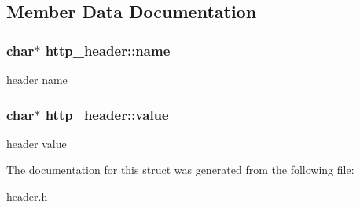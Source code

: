 \subsection{Member Data Documentation}
\hypertarget{structhttp__header_a4b8f00a2ee309ded1317bf3a24450d4b}{
\subsubsection[{name}]{\setlength{\rightskip}{0pt plus 5cm}char$\ast$ {\bf http\_\-header::name}}}
\label{structhttp__header_a4b8f00a2ee309ded1317bf3a24450d4b}
header name \hypertarget{structhttp__header_a59ba803f544343152011284fd833ec73}{
\subsubsection[{value}]{\setlength{\rightskip}{0pt plus 5cm}char$\ast$ {\bf http\_\-header::value}}}
\label{structhttp__header_a59ba803f544343152011284fd833ec73}
header value 

The documentation for this struct was generated from the following file:\begin{DoxyCompactItemize}
\item 
header.h\end{DoxyCompactItemize}
